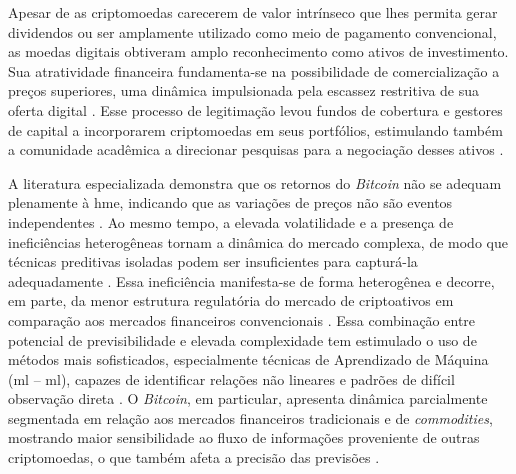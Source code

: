 Apesar de as criptomoedas carecerem de valor intrínseco que lhes permita gerar dividendos ou ser amplamente utilizado como meio de pagamento convencional, as moedas digitais obtiveram amplo reconhecimento como ativos de investimento. Sua atratividade financeira fundamenta-se na possibilidade de comercialização a preços superiores, uma dinâmica impulsionada pela escassez restritiva de sua oferta digital \cite{park2023intelligent}. Esse processo de legitimação levou fundos de cobertura e gestores de capital a incorporarem criptomoedas em seus portfólios, estimulando também a comunidade acadêmica a direcionar pesquisas para a negociação desses ativos \cite{sebastiao2021forecasting}.

A literatura especializada demonstra que os retornos do \textit{Bitcoin} não se adequam plenamente à \ac{hme}, indicando que as variações de preços não são eventos independentes \cite{fakhfekh2020volatility}. Ao mesmo tempo, a elevada volatilidade e a presença de ineficiências heterogêneas tornam a dinâmica do mercado complexa, de modo que técnicas preditivas isoladas podem ser insuficientes para capturá-la adequadamente \cite{park2023intelligent}. Essa ineficiência manifesta-se de forma heterogênea e decorre, em parte, da menor estrutura regulatória do mercado de criptoativos em comparação aos mercados financeiros convencionais \cite{park2023intelligent}. Essa combinação entre potencial de previsibilidade e elevada complexidade tem estimulado o uso de métodos mais sofisticados, especialmente técnicas de Aprendizado de Máquina (\acl{ml} -- \acs{ml}), capazes de identificar relações não lineares e padrões de difícil observação direta \cite{sebastiao2021forecasting,fang2022cryptocurrency}. O \textit{Bitcoin}, em particular, apresenta dinâmica parcialmente segmentada em relação aos mercados financeiros tradicionais e de \textit{commodities}, mostrando maior sensibilidade ao fluxo de informações proveniente de outras criptomoedas, o que também afeta a precisão das previsões \cite{chevallier2021forecast}. 

